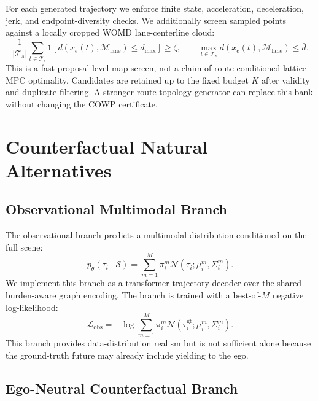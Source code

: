 \documentclass[10pt]{article}
\begin{document}
For each generated trajectory we enforce finite state, acceleration, deceleration, jerk, and endpoint-diversity checks. We additionally screen sampled points against a locally cropped WOMD lane-centerline cloud:
\begin{equation}
    \frac{1}{|\mathcal T_s|}
    \sum_{t\in\mathcal T_s}
    \mathbf 1[d(x_e(t),\mathcal M_{\mathrm{lane}})\le d_{\max}]
    \ge \zeta,
    \qquad
    \max_{t\in\mathcal T_s}d(x_e(t),\mathcal M_{\mathrm{lane}})\le \bar d.
\end{equation}
This is a fast proposal-level map screen, not a claim of route-conditioned lattice-MPC optimality. Candidates are retained up to the fixed budget $K$ after validity and duplicate filtering. A stronger route-topology generator can replace this bank without changing the COWP certificate.

\section{Counterfactual Natural Alternatives}
\label{app:natural_alternatives}

\subsection{Observational Multimodal Branch}
\label{app:obs_branch}

The observational branch predicts a multimodal distribution conditioned on the full scene:
\begin{equation}
    p_\theta(\tau_i \mid \mathcal{S})
    =
    \sum_{m=1}^{M}
    \pi^m_i
    \mathcal{N}
    \left(
    \tau_i;
    \mu^m_i,
    \Sigma^m_i
    \right).
\end{equation}
We implement this branch as a transformer trajectory decoder over the shared burden-aware graph encoding. The branch is trained with a best-of-$M$ negative log-likelihood:
\begin{equation}
    \mathcal{L}_{\mathrm{obs}}
    =
    -\log
    \sum_{m=1}^{M}
    \pi^m_i
    \mathcal{N}
    \left(
    \tau^{\mathrm{gt}}_i;
    \mu^m_i,
    \Sigma^m_i
    \right).
\end{equation}
This branch provides data-distribution realism but is not sufficient alone because the ground-truth future may already include yielding to the ego.

\subsection{Ego-Neutral Counterfactual Branch}
\label{app:neutral_branch}
\end{document}
